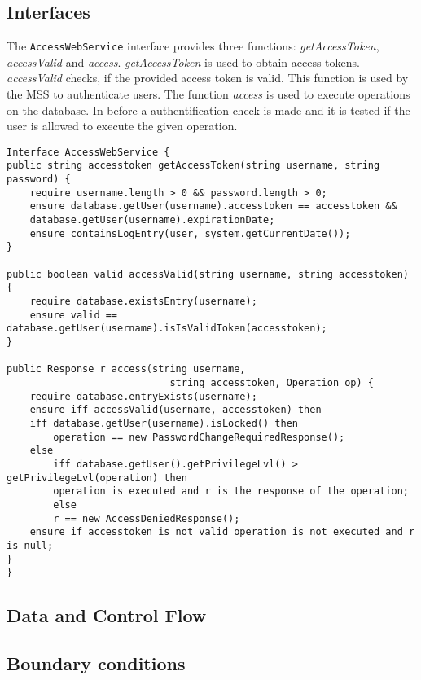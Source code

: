 		\subsection{Interfaces}
			The \verb|AccessWebService| interface provides three functions: \emph{getAccessToken}, \emph{accessValid} and \emph{access}. \emph{getAccessToken} is used to obtain access tokens. \emph{accessValid} checks, if the provided access token is valid. This function is used by the MSS to authenticate users. The function \emph{access} is used to execute operations on the database. In before a authentification check is made and it is tested if the user is allowed to execute the given operation.
\begin{verbatim}
Interface AccessWebService {
public string accesstoken getAccessToken(string username, string password) {
    require username.length > 0 && password.length > 0;
    ensure database.getUser(username).accesstoken == accesstoken &&
    database.getUser(username).expirationDate;
    ensure containsLogEntry(user, system.getCurrentDate());
}

public boolean valid accessValid(string username, string accesstoken) {
    require database.existsEntry(username);
    ensure valid == database.getUser(username).isIsValidToken(accesstoken);
}

public Response r access(string username,
                            string accesstoken, Operation op) {
    require database.entryExists(username);
    ensure iff accessValid(username, accesstoken) then
    iff database.getUser(username).isLocked() then
        operation == new PasswordChangeRequiredResponse();
    else
        iff database.getUser().getPrivilegeLvl() > getPrivilegeLvl(operation) then
        operation is executed and r is the response of the operation;
        else
        r == new AccessDeniedResponse();
    ensure if accesstoken is not valid operation is not executed and r is null;
}
}
\end{verbatim}

        \subsection{Data and Control Flow}

		\subsection{Boundary conditions}
			
        
